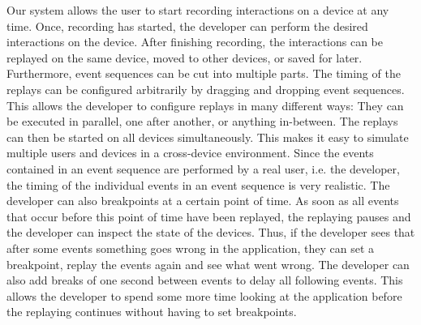 Our system allows the user to start recording interactions on a device at any time. Once, recording has started, the developer can perform the desired interactions on the device. After finishing recording, the interactions can be replayed on the same device, moved to other devices, or saved for later.  Furthermore, event sequences can be cut into multiple parts. The timing of the replays can be configured arbitrarily by dragging and dropping event sequences. This allows the developer to configure replays in many different ways: They can be executed in parallel, one after another, or anything in-between. The replays can then be started on all devices simultaneously. This makes it easy to simulate multiple users and devices in a cross-device environment. Since the events contained in an event sequence are performed by a real user, i.e. the developer, the timing of the individual events in an event sequence is very realistic. The developer can also breakpoints at a certain point of time. As soon as all events that occur before this point of time have been replayed, the replaying pauses and the developer can inspect the state of the devices. Thus, if the developer sees that after some events something goes wrong in the application, they can set a breakpoint, replay the events again and see what went wrong. The developer can also add breaks of one second between events to delay all following events. This allows the developer to spend some more time looking at the application before the replaying continues without having to set breakpoints. 